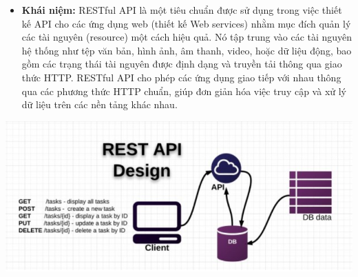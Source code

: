 \begin{itemize}
    \item \textbf{Khái niệm:}  RESTful API là một tiêu chuẩn được sử dụng trong việc thiết kế API cho các ứng dụng web (thiết kế Web services) nhằm mục đích quản lý các tài nguyên (resource) một cách hiệu quả. Nó tập trung vào các tài nguyên hệ thống như tệp văn bản, hình ảnh, âm thanh, video, hoặc dữ liệu động, bao gồm các trạng thái tài nguyên được định dạng và truyền tải thông qua giao thức HTTP. RESTful API cho phép các ứng dụng giao tiếp với nhau thông qua các phương thức HTTP chuẩn, giúp đơn giản hóa việc truy cập và xử lý dữ liệu trên các nền tảng khác nhau.
\end{itemize}

\includegraphics[width=\textwidth]{img/API.png}

